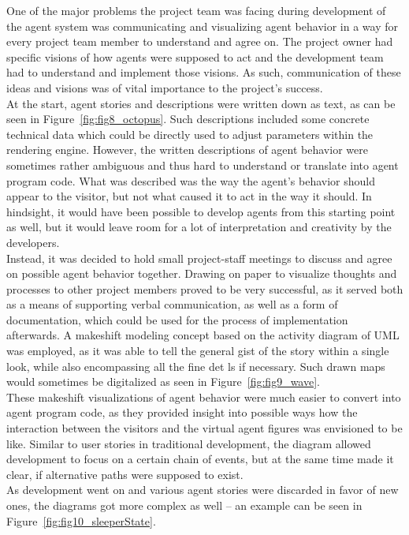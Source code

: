 \documentclass[draft,final]{vutinfth} %
\begin{document}
One of the major problems the project team was facing during development of the agent system was communicating and visualizing agent behavior in a way for every project team member to understand and agree on. 
The project owner had specific visions of how agents were supposed to act and the development team had to understand and implement those visions. 
As such, communication of these ideas and visions was of vital importance to the project’s success. \\
At the start, agent stories and descriptions were written down as text, as can be seen in Figure~\ref{fig:fig8_octopus}. 
Such descriptions included some concrete technical data which could be directly used to adjust parameters within the rendering engine. 
However, the written descriptions of agent behavior were sometimes rather ambiguous and thus hard to understand or translate into agent program code. 
What was described was the way the agent’s behavior should appear to the \gls{visitor}, but not what caused it to act in the way it should. 
In hindsight, it would have been possible to develop agents from this starting point as well, but it would leave room for a lot of interpretation and creativity by the developers. \\
Instead, it was decided to hold small project-staff meetings to discuss and agree on possible agent behavior together. 
Drawing on paper to visualize thoughts and processes to other project members proved to be very successful, as it served both as a means of supporting verbal communication, as well as a form of documentation, which could be used for the process of implementation afterwards. 
A makeshift modeling concept based on the activity diagram of UML was employed, as it was able to tell the general gist of the story within a single look, while also encompassing all the fine det ls if necessary. 
Such drawn maps would sometimes be digitalized as seen in Figure~\ref{fig:fig9_wave}. \\
These makeshift visualizations of agent behavior were much easier to convert into agent program code, as they provided insight into possible ways how the interaction between the \glspl{visitor} and the virtual \glspl{agent figure} was envisioned to be like. 
Similar to user stories in traditional development, the diagram allowed development to focus on a certain chain of events, but at the same time made it clear, if alternative paths were supposed to exist. \\
As development went on and various agent stories were discarded in favor of new ones, the diagrams got more complex as well – an example can be seen in Figure~\ref{fig:fig10_sleeperState}. 
\end{document}
